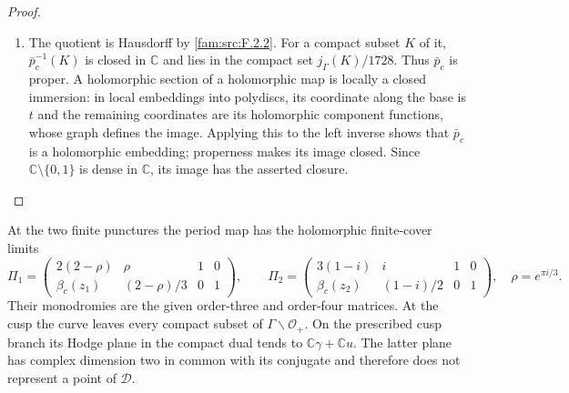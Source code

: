 \begin{proof}
\begin{enumerate}[label=\arabic*.,leftmargin=*]
\item The quotient is Hausdorff by \ref{fam:src:F.2.2}.  For a compact subset $K$ of it,
$\bar p_c^{-1}(K)$ is closed in $\mathbb C$ and lies in the compact set
$j_\Gamma(K)/1728$.  Thus $\bar p_c$ is proper.  A holomorphic section of
a holomorphic map is locally a closed immersion: in local embeddings
into polydiscs, its coordinate along the base is $t$ and the remaining
coordinates are its holomorphic component functions, whose graph
defines the image.  Applying this to the left inverse shows that
$\bar p_c$ is a holomorphic embedding; properness makes its image
closed.  Since $\mathbb C\setminus\{0,1\}$ is dense in $\mathbb C$, its
image has the asserted closure.
\end{enumerate}
\end{proof}

\begin{proposition}\hypertarget{tag-01RF}{}\label{fam:src:F.3.2}\label{fam:st:F.3.2}

At the two finite punctures the period map has the holomorphic
finite-cover limits
\[
 \Pi_1=
 \begin{pmatrix}2(2-\rho)&\rho&1&0\\
 \beta_c(z_1)&(2-\rho)/3&0&1\end{pmatrix},\qquad
 \Pi_2=
 \begin{pmatrix}3(1-i)&i&1&0\\
 \beta_c(z_2)&(1-i)/2&0&1\end{pmatrix},
 \quad \rho=e^{\pi i/3}.
\]
Their monodromies are the given order-three and order-four matrices.
At the cusp the curve leaves every compact subset of
$\Gamma\backslash\mathcal O_+$.  On the prescribed cusp branch its
Hodge plane in the compact dual tends to
$\mathbb C\gamma+\mathbb Cu$.  The latter plane has complex dimension
two in common with its conjugate and therefore does not represent a
point of $\mathcal D$.
\end{proposition}



